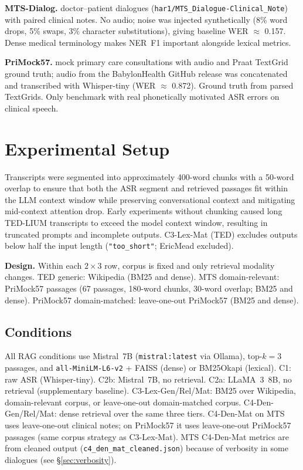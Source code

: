 \documentclass[11pt,a4paper,twocolumn]{article}
\begin{document}
\textbf{MTS-Dialog.} doctor--patient dialogues
(\texttt{har1/MTS\_Dialogue-Clinical\_Note}) with paired clinical notes. No
audio; noise was injected synthetically (8\% word drops, 5\% swaps, 3\%
character substitutions), giving baseline WER $\approx$ 0.157. Dense medical
terminology makes NER~F1 important alongside lexical metrics.

\textbf{PriMock57.} mock primary care consultations
\cite{papadopoulos2022} with audio and Praat TextGrid ground truth; audio
from the BabylonHealth GitHub release was concatenated and transcribed with
Whisper-tiny (WER $\approx$ 0.872). Ground truth from parsed TextGrids.
Only benchmark with real phonetically motivated ASR errors on clinical speech.

\section{Experimental Setup}

Transcripts were segmented into approximately 400-word chunks
with a 50-word overlap \cite{karpukhin2020,lewis2020,liu2023} to ensure that
both the ASR segment and retrieved passages fit within the LLM context window
while preserving conversational context and mitigating mid-context
attention drop. Early experiments without chunking
caused long TED-LIUM transcripts to exceed the model context window, resulting
in truncated prompts and incomplete outputs. C3-Lex-Mat (TED) excludes outputs
below half the input length (\texttt{"too\_short"}; EricMead excluded).

\begin{notebox}
\textbf{Design.} Within each $2{\times}3$ row, corpus is fixed and only
retrieval modality changes. TED generic: Wikipedia (BM25 and dense). MTS
domain-relevant: PriMock57 passages (67 passages, 180-word chunks,
30-word overlap; BM25 and dense). PriMock57 domain-matched: leave-one-out PriMock57 (BM25 and dense).
\end{notebox}

\subsection{Conditions}
\label{sec:conditions}

All RAG conditions use Mistral~7B (\texttt{mistral:latest} via Ollama),
top-$k{=}3$ passages, and \texttt{all-MiniLM-L6-v2} + FAISS (dense) or
BM25Okapi (lexical). C1: raw ASR (Whisper-tiny). C2b: Mistral~7B, no
retrieval. C2a: LLaMA~3~8B, no retrieval (supplementary baseline).
C3-Lex-Gen/Rel/Mat: BM25 over Wikipedia, domain-relevant corpus, or
leave-one-out domain-matched corpus. C4-Den-Gen/Rel/Mat: dense retrieval over
the same three tiers. C4-Den-Mat on MTS uses leave-one-out clinical notes; on
PriMock57 it uses leave-one-out PriMock57 passages (same corpus strategy as
C3-Lex-Mat). MTS C4-Den-Mat metrics are from cleaned output
(\texttt{c4\_den\_mat\_cleaned.json}) because of verbosity in some dialogues
(see \S\ref{sec:verbosity}).
\end{document}
